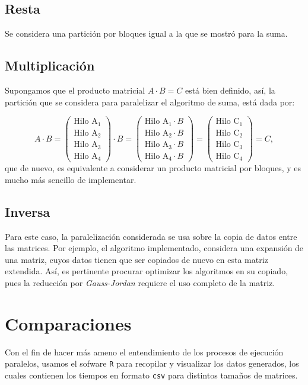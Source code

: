 \documentclass{article}
\begin{document}
\subsection*{Resta}
Se considera una partición por bloques igual a la que se mostró para la suma.
\subsection*{Multiplicación}
Supongamos que el producto matricial $A\cdot B = C$ está bien definido, así, la partición que se considera para paralelizar el algoritmo de suma, está dada por:

\begin{equation*}
	A\cdot B =
	\begin{pmatrix}
		\text{Hilo A}_1\\ 
		\text{Hilo A}_2\\
		\text{Hilo A}_3\\
		\text{Hilo A}_4
	\end{pmatrix}\cdot B = 
	\begin{pmatrix}
	\text{Hilo A}_1\cdot B\\ 
	\text{Hilo A}_2\cdot B\\
	\text{Hilo A}_3\cdot B\\
	\text{Hilo A}_4\cdot B  
	\end{pmatrix}=
	\begin{pmatrix}
		\text{Hilo C}_1\\ 
		\text{Hilo C}_2\\
		\text{Hilo C}_3\\
		\text{Hilo C}_4
	\end{pmatrix} = C,
\end{equation*}
que de nuevo, es equivalente a considerar un producto matricial por bloques, y es mucho más sencillo de implementar.
\subsection*{Inversa}
Para este caso, la paralelización considerada se usa sobre la copia de datos entre las matrices. Por ejemplo, el algoritmo implementado, considera una expansión de una matriz, cuyos datos tienen que ser copiados de nuevo en esta matriz extendida. Así, es pertinente procurar optimizar los algoritmos en su copiado, pues la reducción por \textit{Gauss-Jordan}
requiere el uso completo de la matriz.
\section{Comparaciones}
Con el fin de hacer más ameno el entendimiento de los procesos de ejecución paralelos, usamos el sofware \texttt{R} para recopilar y visualizar los datos generados, los cuales contienen los tiempos en formato \texttt{csv} para distintos tamaños de matrices.
\end{document}
